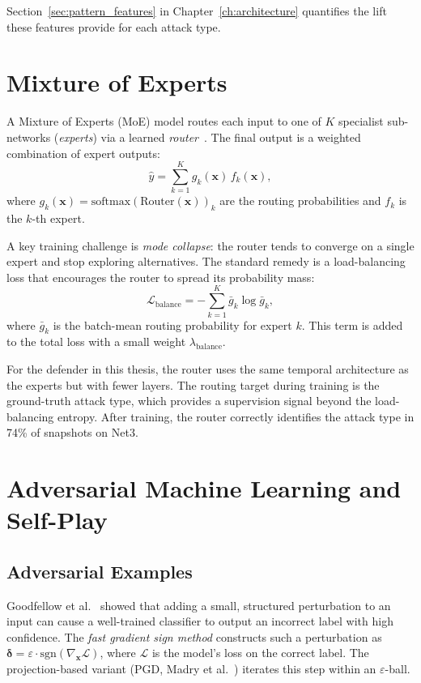 Section~\ref{sec:pattern_features} in Chapter~\ref{ch:architecture}
quantifies the lift these features provide for each attack type.

\section{Mixture of Experts}
\label{sec:moe_background}

A Mixture of Experts (MoE) model routes each input to one of $K$ specialist
sub-networks (\emph{experts}) via a learned \emph{router}~\cite{jacobs1991moe,
shazeer2017outrageously}. The final output is a weighted combination
of expert outputs:
\begin{equation}
  \hat{y} = \sum_{k=1}^K g_k(\mathbf{x}) \, f_k(\mathbf{x}),
\end{equation}
where $g_k(\mathbf{x}) = \mathrm{softmax}(\text{Router}(\mathbf{x}))_k$
are the routing probabilities and $f_k$ is the $k$-th expert.

A key training challenge is \emph{mode collapse}: the router tends
to converge on a single expert and stop exploring alternatives.
The standard remedy is a load-balancing loss that encourages the
router to spread its probability mass:
\begin{equation}
  \mathcal{L}_\text{balance} = -\sum_{k=1}^K \bar{g}_k \log \bar{g}_k,
\end{equation}
where $\bar{g}_k$ is the batch-mean routing probability for expert
$k$. This term is added to the total loss with a small weight
$\lambda_\text{balance}$.

For the \moe{} defender in this thesis, the router uses the same
temporal \gnn{} architecture as the experts but with fewer layers.
The routing target during training is the ground-truth attack type,
which provides a supervision signal beyond the load-balancing entropy.
After training, the router correctly identifies the attack type in
74\% of snapshots on Net3.

\section{Adversarial Machine Learning and Self-Play}
\label{sec:adversarial_background}

\subsection{Adversarial Examples}

Goodfellow et al.~\cite{goodfellow2015explaining} showed that adding
a small, structured perturbation to an input can cause a
well-trained classifier to output an incorrect label with high
confidence. The \emph{fast gradient sign method} constructs such
a perturbation as $\boldsymbol{\delta} = \varepsilon \cdot
\mathrm{sgn}(\nabla_{\mathbf{x}} \mathcal{L})$, where $\mathcal{L}$
is the model's loss on the correct label. The projection-based variant
(PGD, Madry et al.~\cite{madry2018pgd}) iterates this step within an
$\varepsilon$-ball.

